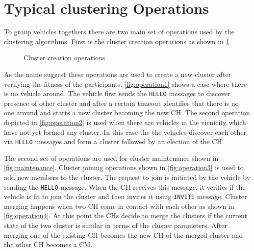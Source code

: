 \documentclass[]{ccs-thesis}
\begin{document}
\section{Typical clustering Operations}

To group vehicles togethers there are two main set of operations used by the clustering algorithms. First is the cluster creation operations
as shown in \cref{fig:creation}. 

\begin{figure}[h]
	\centering
    \vfill%
    
	\caption{Cluster creation operations}
	\label{fig:creation}
\end{figure}

As the name suggest these operations are used to create a new cluster after verifying the fitness of the 
participants. \cref{fig:operation1} shows a case where there is no vehicle around. The vehicle first sends the \texttt{HELLO} messages to
discover presence of other cluster and after a certain timeout identifies that there is no one around and starts a new cluster becoming the
new \ac{CH}. The second operation depicted in \cref{fig:operation2} is used when there are vehicles in the vicnicity which have not yet formed
any cluster. In this case the the vehicles discover each other via \texttt{HELLO} messages and form a cluster followed by an election of the
\ac{CH}.

The second set of operations are used for cluster maintenance shown in \cref{fig:maintenance}. Cluster joining operations shown in \cref{fig:operation3}
is used to add new members to the cluster. The request to join is initiated by the vehicle by sending the \texttt{HELLO} message. When the \ac{CH} receives
this message, it verifies if the vehicle is fit to join the cluster and then invites it using \texttt{INVITE} message. Cluster merging happens when two
\ac{CH} come in contact with each other as shown in \cref{fig:operation4}. At this point the \ac{CH}s decide to merge the clusters if the current state of
the two cluster is similar in terms of the cluster parameters. After merging one of the existing \ac{CH} becomes the new \ac{CH} of the merged cluster and
the other \ac{CH} becomes a \ac{CM}.
\end{document}
